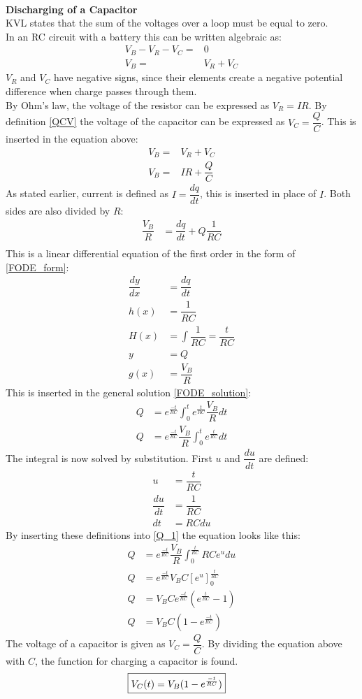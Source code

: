\\
\textbf{Discharging of a Capacitor}\\
KVL states that the sum of the voltages over a loop must be equal to zero. 
\\
In an RC circuit with a battery this can be written algebraic as:
\begin{align*}
V_B-V_R-V_C =& 0 \\
V_B=&V_R+V_C
\end{align*}
$V_R$ and $V_C$ have negative signs, since their elements create a negative potential difference when charge passes through them.
\\
By Ohm's law, the voltage of the resistor can be expressed as $V_R=IR$. By definition \eqref{QCV} the voltage of the capacitor can be expressed as $V_C=\dfrac{Q}{C}$. This is inserted in the equation above:
\begin{align*}
V_B=&V_R+V_C \\
V_B =& IR+\dfrac{Q}{C}
\end{align*}
As stated earlier, current is defined as $I =\dfrac{dq}{dt}$, this is inserted in place of $I$. Both sides are also divided by $R$:
\begin{align*}
\dfrac{V_B}{R} &= \dfrac{dq}{dt} + Q\dfrac{1}{RC} \\
\end{align*}
This is a linear differential equation of the first order in the form of \eqref{FODE_form}:
\begin{align*}
\dfrac{dy}{dx}&=\dfrac{dq}{dt}
\\
h(x)&=\dfrac{1}{RC}
\\
H(x)&=\int \dfrac{1}{RC}=\dfrac{t}{RC}
\\
y &= Q
\\
g(x)&= \dfrac{V_B}{R}
\end{align*}
This is inserted in the general solution \eqref{FODE_solution}:
\begin{align}
Q&= e^{\frac{-t}{RC}}\int_{0}^{t}e^{\frac{t}{RC}}\dfrac{V_B}{R}dt
\\
Q&= e^{\frac{-t}{RC}}\dfrac{V_B}{R}\int_{0}^{t}e^{\frac{t}{RC}}dt \label{Q_1}
\end{align}
The integral is now solved by substitution. First $u$ and $\dfrac{du}{dt}$ are defined:
\begin{align*}
u &= \dfrac{t}{RC}
\\
\dfrac{du}{dt}&=\dfrac{1}{RC}
\\
dt &=RC du
\end{align*} 
By inserting these definitions into \eqref{Q_1} the equation looks like this:
\begin{align*}
Q&=e^{\frac{-t}{RC}}\dfrac{V_B}{R}\int_{0}^{\frac{t}{RC}}RCe^u du
\\
Q&=e^{\frac{-t}{RC}} V_B C [e^u]_{0}^{\frac{t}{RC}}
\\
Q&=V_B C e^{\frac{-t}{RC}}(e^{\frac{t}{RC}}-1)
\\
Q&=V_B C (1-e^{\frac{-t}{RC}})
\end{align*} 
The voltage of a capacitor is given as $V_C=\dfrac{Q}{C}$. By dividing the equation above with $C$, the function for charging a capacitor is found.
\begin{align}
\label{V_up}
\Aboxed{
V_C(t)=V_B(1-e^{\frac{-t}{RC}})
}
\end{align}
